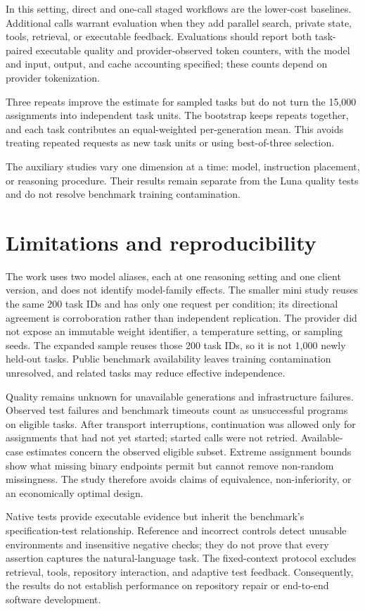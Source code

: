 \documentclass[10pt,letterpaper]{article}
\begin{document}
In this setting, direct and one-call staged workflows are the lower-cost baselines. Additional calls warrant evaluation when they add parallel search, private state, tools, retrieval, or executable feedback. Evaluations should report both task-paired executable quality and provider-observed token counters, with the model and input, output, and cache accounting specified; these counts depend on provider tokenization.

Three repeats improve the estimate for sampled tasks but do not turn the 15,000 assignments into independent task units. The bootstrap keeps repeats together, and each task contributes an equal-weighted per-generation mean. This avoids treating repeated requests as new task units or using best-of-three selection.

The auxiliary studies vary one dimension at a time: model, instruction placement, or reasoning procedure. Their results remain separate from the Luna quality tests and do not resolve benchmark training contamination.

\section*{Limitations and reproducibility}
The work uses two model aliases, each at one reasoning setting and one client version, and does not identify model-family effects. The smaller mini study reuses the same 200 task IDs and has only one request per condition; its directional agreement is corroboration rather than independent replication. The provider did not expose an immutable weight identifier, a temperature setting, or sampling seeds. The expanded sample reuses those 200 task IDs, so it is not 1,000 newly held-out tasks. Public benchmark availability leaves training contamination unresolved, and related tasks may reduce effective independence.

Quality remains unknown for unavailable generations and infrastructure failures. Observed test failures and benchmark timeouts count as unsuccessful programs on eligible tasks. After transport interruptions, continuation was allowed only for assignments that had not yet started; started calls were not retried. Available-case estimates concern the observed eligible subset. Extreme assignment bounds show what missing binary endpoints permit but cannot remove non-random missingness. The study therefore avoids claims of equivalence, non-inferiority, or an economically optimal design.

Native tests provide executable evidence but inherit the benchmark's specification-test relationship. Reference and incorrect controls detect unusable environments and insensitive negative checks; they do not prove that every assertion captures the natural-language task. The fixed-context protocol excludes retrieval, tools, repository interaction, and adaptive test feedback. Consequently, the results do not establish performance on repository repair or end-to-end software development.
\end{document}
